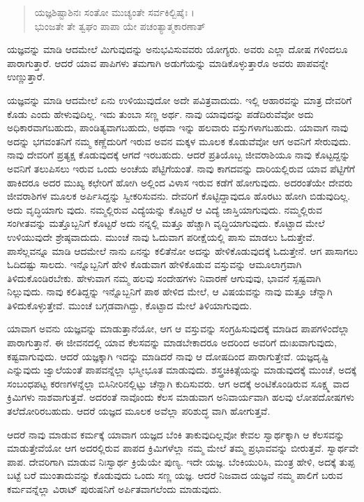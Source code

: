 \begin{verse}
ಯಜ್ಞಶಿಷ್ಟಾಶಿನಃ ಸಂತೋ ಮುಚ್ಯಂತೇ ಸರ್ವಕಿಲ್ಬಿಷೈಃ ।\\ಭುಂಜತೇ ತೇ ತ್ವಘಂ ಪಾಪಾ ಯೇ ಪಚಂತ್ಯಾತ್ಮಕಾರಣಾತ್ 
\end{verse}

{\small ಯಜ್ಞವನ್ನು ಮಾಡಿ ಆದಮೇಲೆ ಮಿಗುವುದನ್ನು ಅನುಭವಿಸುವವರು ಯೋಗ್ಯರು. ಅವರು ಎಲ್ಲಾ ದೋಷ ಗಳಿಂದಲೂ ಪಾರಾಗುತ್ತಾರೆ. ಆದರೆ ಯಾವ ಪಾಪಿಗಳು ತಮಗಾಗಿ ಅಡುಗೆಯನ್ನು ಮಾಡಿಕೊಳ್ಳುತ್ತಾರೊ ಅವರು ಪಾಪವನ್ನೇ ಉಣ್ಣುತ್ತಾರೆ.}

ಯಜ್ಞವನ್ನು ಮಾಡಿ ಆದಮೇಲೆ ಏನು ಉಳಿಯುವುದೋ ಅದೇ ಪವಿತ್ರವಾದುದು. ಇಲ್ಲಿ ಆಹಾರವನ್ನು ಮಾತ್ರ ದೇವರಿಗೆ ಕೊಡು ಎಂದು ಹೇಳುವುದಿಲ್ಲ. ಇದು ತುಂಬಾ ಸಣ್ಣ ಅರ್ಥ. ನಾವು ಯಾವುದನ್ನು ಪಡೆದಿರುವೆವೋ ಅದು ಅಧಿಕಾರವಾಗಬಹುದು, ಪಾಂಡಿತ್ಯವಾಗಬಹುದು, ಅಥವಾ ಇನ್ನು ಹಲವಾರು ವಸ್ತುಗಳಾಗಬಹುದು. ಯಾವಾಗ ನಾವು ಅದನ್ನು ಭಗವಂತನಿಗೆ ನಮ್ಮ ಕಣ್ಣೆದುರಿಗೆ ಇರುವ ಅವನ ಮಕ್ಕಳ ಮೂಲಕ ಕೊಡುವೆವೋ ಆಗ ಅವನಿಗೆ ಸೇರುವುದು. ನಾವು ದೇವರಿಗೆ ಪ್ರತ್ಯಕ್ಷ ಕೊಡುವುದಕ್ಕೆ ಆಗದೆ ಇರಬಹುದು. ಆದರೆ ಪ್ರತಿಯೊಬ್ಬ ಜೀವರಾಶಿಯೂ ನಾವು ಕೊಟ್ಟದ್ದನ್ನು ಅವನಿಗೆ ತಲುಪಿಸಲು ಇರುವ ಒಂದು ಅಂಚೆಯ ಪೆಟ್ಟಿಗೆಯಂತೆ. ನಾವು ಕಾಗದವನ್ನು ದಾರಿಯಲ್ಲಿರುವ ಯಾವ ಪೆಟ್ಟಿಗೆಗೆ ಹಾಕಿದರೂ ಅದರ ಮುಖ್ಯ ಕಛೇರಿಗೆ ಹೋಗಿ ಅಲ್ಲಿಂದ ವಿಳಾಸ ಇರುವ ಕಡೆಗೆ ಹೋಗುವುದು. ಅದರಂತೆಯೇ ದೇವರು ಜೀವರಾಶಿಗಳ ಮೂಲಕ ಅರ್ಪಿಸಿದ್ದನ್ನು ಸ್ವೀಕರಿಸುವನು. ದೇವರಿಗೆ ಕೊಟ್ಟಿದ್ದಾವುದೂ ಹೊರಟು ಹೋಗಿ ಬಿಡುವುದಿಲ್ಲ. ಅದು ವೃದ್ಧಿಯಾಗು ವುದು. ನಮ್ಮಲ್ಲಿರುವ ವಿದ್ಯೆಯನ್ನು ಕೊಟ್ಟರೆ ಆ ವಿದ್ಯೆ ಜಾಸ್ತಿಯಾಗುವುದು. ನಮ್ಮಲ್ಲಿರುವ ಸಂಗೀತವನ್ನು ಮತ್ತೊಬ್ಬನಿಗೆ ಕೊಟ್ಟರೆ ಅದು ನನ್ನಲ್ಲಿ ಮತ್ತೂ ಹೆಚ್ಚಾಗಿ ವೃದ್ಧಿಯಾಗುವುದು. ಕೊಟ್ಟಾದ ಮೇಲೆ ಉಳಿಯುವುದೇ ಶ್ರೇಷ್ಠವಾದುದು. ಮುಂಚೆ ನಾವು ಓದುವಾಗ ಪರೀಕ್ಷೆಯಲ್ಲಿ ಪಾಸು ಮಾಡಲು ಓದುತ್ತೇವೆ. ಪಾಸೆಲ್ಲವನ್ನೂ ಮಾಡಿ ಆದಮೇಲೆ ನಾನು ಏನನ್ನು ಕಲಿತೆನೋ ಅದನ್ನು ಹೇಳಿಕೊಡುವುದಕ್ಕೆ ಓದುತ್ತೇನೆ. ಆಗ ಪಾಸಾಗಲು ಓದಿದಷ್ಟು ಸಾಲದು. ಇನ್ನೊಬ್ಬನಿಗೆ ಹೇಳಿ ಕೊಡುವಾಗ ಹೇಳಿಕೊಡುವ ವಸ್ತುವನ್ನು ಆಮೂಲಾಗ್ರವಾಗಿ ತಿಳಿದುಕೊಂಡಿರಬೇಕು. ಹೇಳುವಾಗ ನಮ್ಮ ಹಲವು ಸಂದೇಹಗಳು ನಿವಾರಣೆ ಆಗುವುವು, ಭಾವನೆ ಸ್ಪಷ್ಟವಾಗಿ ನಿಲ್ಲುವುದು. ನಾವು ಕಲಿತಿದ್ದನ್ನು ಇನ್ನೊಬ್ಬನಿಗೆ ಪಾಠ ಹೇಳಿದ ಮೇಲೆ, ಆ ವಿಷಯವನ್ನು ನಾವು ಮತ್ತೂ ಚೆನ್ನಾಗಿ ತಿಳಿದುಕೊಳ್ಳುತ್ತೇವೆ. ಮುಂಚೆ ಬಗ್ಗಡವಾಗಿದ್ದು, ಕೊಟ್ಟಾದ ಮೇಲೆ ತಿಳಿಯಾಗುವುದು.

ಯಾವಾಗ ಅವನು ಯಜ್ಞವನ್ನು ಮಾಡುತ್ತಾನೆಯೋ, ಆಗ ಆ ವಸ್ತುವನ್ನು ಸಂಗ್ರಹಿಸುವುದಕ್ಕೆ ಮಾಡಿದ ಪಾಪಗಳಿಂದೆಲ್ಲಾ ಪಾರಾಗುತ್ತಾನೆ. ಈ ಜೀವನದಲ್ಲಿ ಯಾವ ಕೆಲಸವನ್ನು ಮಾಡಬೇಕಾದರೂ ಅದರಿಂದ ಅವರಿಗೆ ದುಃಖವಾಗುವುದು, ಕಷ್ಟವಾಗುವುದು. ಆದರೆ ಯಜ್ಞಕ್ಕಾಗಿ ಇದನ್ನು ಮಾಡಿದರೆ ನಾವು ಆ ದೋಷದಿಂದ ಪಾರಾಗುತ್ತೇವೆ. ಯಜ್ಞದೃಷ್ಟಿ ಎನ್ನುವುದು ಜ್ವಾಲೆಯಂತೆ ಪಾಪವನ್ನೆಲ್ಲಾ ಭಸ್ಮೀಭೂತ ಮಾಡುವುದು. ಶಸ್ತ್ರಚಿಕಿತ್ಸೆಯನ್ನು ಮಾಡುವುದಕ್ಕೆ ಮುಂಚೆ, ಅದಕ್ಕೆ ಸಂಬಂಧಪಟ್ಟ ಕರಣಗಳನ್ನೆಲ್ಲಾ ಬಿಸಿನೀರಿನಲ್ಲಿಟ್ಟು ಚೆನ್ನಾಗಿ ಕುದಿಸುವರು. ಆಗ ಅದಕ್ಕೆ ಅಂಟಿಕೊಂಡಿರುವ ಸೂಕ್ಷ್ಮ ವಾದ ಕ್ರಿಮಿಗಳು ನಾಶವಾಗುತ್ತವೆ. ಅದರಂತೆ ನಾವೊಂದು ಕೆಲಸ ಮಾಡುವಾಗ ಅನಿವಾರ್ಯವಾಗಿ ಹಲವು ಲೋಪದೋಷಗಳು ತಲೆದೋರಿರಬಹುದು. ಆದರೆ ಯಜ್ಞದ ಮೂಲಕ ಅವೆಲ್ಲಾ ಪರಿಶುದ್ಧ ವಾಗಿ ಹೋಗುತ್ತವೆ.

ಆದರೆ ನಾವು ಮಾಡುವ ಕರ್ಮಕ್ಕೆ ಯಾವಾಗ ಯಜ್ಞದ ಬೆಂಕಿ ತಾಕುವುದಿಲ್ಲವೋ ಕೇವಲ ಸ್ವಾರ್ಥಕ್ಕಾಗಿ ಆ ಕೆಲಸವನ್ನು ಮಾಡುತ್ತೇವೆಯೋ ಆಗ ಅದರಲ್ಲಿರುವ ಪಾಪದ ಕ್ರಿಮಿಗಳೆಲ್ಲಾ ನಮ್ಮ ಮೇಲೆ ತಮ್ಮ ಪ್ರಭಾವವನ್ನು ಬೀರುತ್ತವೆ. ಸ್ವಾರ್ಥವೇ ಪಾಪ. ದೇವರಿಗಾಗಿ ಮಾಡುವ ನಿಃಸ್ವಾರ್ಥ ಕ್ರಿಯೆಯೇ ಪುಣ್ಯ. ಇದೇ ಯಜ್ಞ. ಬೆಂಕಿಯುರಿಸಿ, ಮಂತ್ರ ಹೇಳಿ, ಅದಕ್ಕೆ ತುಪ್ಪ ಬಟ್ಟೆ ಬರೆ ಮುಂತಾದುವನ್ನು ಕೊಡುವುದು ಒಂದು ಸಣ್ಣ ಯಜ್ಞ. ಆದರೆ ನಿಜವಾದ ಯಜ್ಞವೆ ನಮ್ಮ ಪಾಲಿಗೆ ಬರುವ ಕರ್ಮವನ್ನೆಲ್ಲಾ ವಿರಾಟ್ ಪುರುಷನಿಗೆ ಅರ್ಪಿತವಾಗಲೆಂದು ಮಾಡುವುದು.

